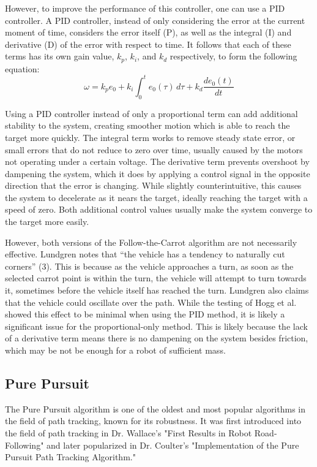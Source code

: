 \documentclass[mla8alt]{mla}
\begin{document}
\begin{paper}
However, to improve the performance of this controller, one can use a PID controller. A PID controller, instead of only considering the error at the current moment of time, considers the error itself (P), as well as the integral (I) and derivative (D) of the error with respect to time. It follows that each of these terms has its own gain value, $k_p$, $k_i$, and $k_d$ respectively, to form the following equation:
\begin{equation}
\omega = k_p e_0 + k_i \int_0^t \! e_0(\tau) \, d\tau + k_d \frac{de_0(t)}{dt}
\end{equation}

Using a PID controller instead of only a proportional term can add additional stability to the system, creating smoother motion which is able to reach the target more quickly. The integral term works to remove steady state error, or small errors that do not reduce to zero over time, usually caused by the motors not operating under a certain voltage. The derivative term prevents overshoot by dampening the system, which it does by applying a control signal in the opposite direction that the error is changing. While slightly counterintuitive, this causes the system to decelerate as it nears the target, ideally reaching the target with a speed of zero. Both additional control values usually make the system converge to the target more easily.

However, both versions of the Follow-the-Carrot algorithm are not necessarily effective. Lundgren notes that ``the vehicle has a tendency to naturally cut corners'' (3). This is because as the vehicle approaches a turn, as soon as the selected carrot point is within the turn, the vehicle will attempt to turn towards it, sometimes before the vehicle itself has reached the turn. Lundgren also claims that the vehicle could oscillate over the path. While the testing of Hogg et al. showed this effect to be minimal when using the PID method, it is likely a significant issue for the proportional-only method. This is likely because the lack of a derivative term means there is no dampening on the system besides friction, which may be not be enough for a robot of sufficient mass.

\subsection{Pure Pursuit}

The Pure Pursuit algorithm is one of the oldest and most popular algorithms in the field of path tracking, known for its robustness. It was first introduced into the field of path tracking in Dr. Wallace's "First Results in Robot Road-Following" and later popularized in Dr. Coulter's "Implementation of the Pure Pursuit Path Tracking Algorithm."


\end{paper}
\end{document}
